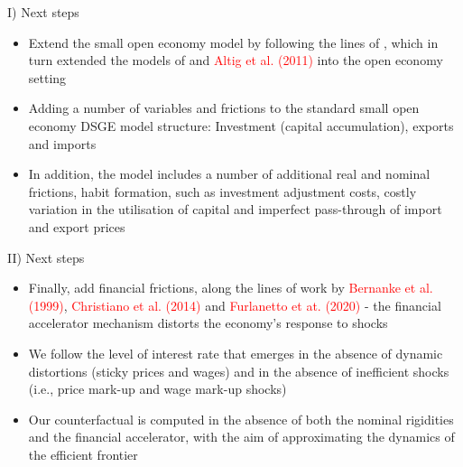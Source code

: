 \documentclass[9pt]{beamer}
\begin{document}
\begin{frame}{I) Next steps}

    \begin{itemize}
        \item Extend the small open economy model by following the lines of \textcolor{red}{\citet{Adolfson:2007}}, which in turn extended the models of \textcolor{red}{\citet{Christiano:2005}} and \textcolor{red}{Altig et al. (2011)} into the open economy setting
        
        \item Adding a number of variables and frictions to the standard small open economy DSGE model structure: Investment (capital accumulation), exports and imports 
        
        \item In addition, the model includes a number of additional real and nominal frictions, habit formation, such as investment adjustment costs, costly variation in the utilisation of capital and imperfect pass-through of import and export prices 
        
    
    
    
\end{itemize}


\end{frame}
\begin{frame}{II) Next steps}
    \begin{itemize}
           \item Finally, add financial frictions, along the lines of work by \textcolor{red}{Bernanke et al. (1999)}, \textcolor{red}{Christiano et al. (2014)} and \textcolor{red}{Furlanetto et at. (2020)} -  the financial accelerator mechanism distorts the economy’s response to shocks 
    
        \item We follow \textcolor{red}{\citet{Smets:2007}} the level of interest rate that emerges in the absence of dynamic distortions (sticky prices and wages) and in the absence of inefficient shocks (i.e., price mark-up and wage mark-up shocks)
        
        \item Our counterfactual is computed in the absence of both the nominal rigidities and the financial accelerator, with the aim of approximating the dynamics of the efficient frontier
        
      
    
    
\end{itemize}


\end{frame}
\end{document}
